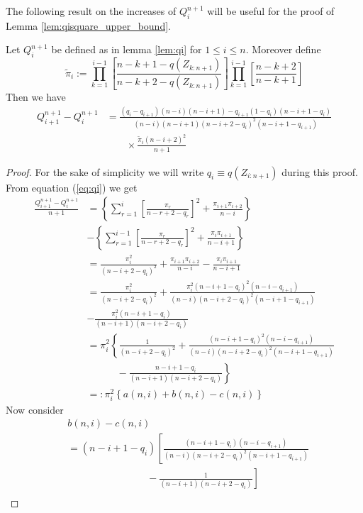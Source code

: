 %
The following result on the increases of $Q_i^{n+1}$ will be useful for the proof of Lemma \ref{lem:qisquare_upper_bound}.
\begin{lemma}
	Let $Q_i^{n+1}$ be defined as in lemma \ref{lem:qi} for $1\leq i\leq n$. Moreover define 
	$$\tilde{\pi}_i := \prod\limits_{k=1}^{i-1} \left[\frac{n-k+1-q(Z_{k:n+1})}{n-k+2-q(Z_{k:n+1})}\right]\prod\limits_{k=1}^{i-1} \left[\frac{n-k+2}{n-k+1}\right]$$
	Then we have
	\begin{align*}
		Q_{i+1}^{n+1} - Q_{i}^{n+1} &= \frac{(q_i-q_{i+1})(n-i)(n-i+1)-q_{i+1}(1-q_i)(n-i+1-q_i) }{(n-i)(n-i+1)(n-i+2-q_i)^2(n-i+1-q_{i+1})}\\
		&\qquad\times \frac{\tilde{\pi}_i(n-i+2)^2}{n+1}
	\end{align*}
	\label{lem:qi_increas}
%
	\begin{proof}
		For the sake of simplicity we will write $q_{i}\equiv q(Z_{i:n+1})$ during this proof. From equation (\ref{eq:qi}) we get
		\begin{align}
		\frac{Q_{i+1}^{n+1}-Q_i^{n+1}}{n+1} &= \left\{ \sum\limits_{r=1}^{i} \left[ \frac{\pi_r}{n-r+2-q_r} \right]^2 + \frac{\pi_{i+1}\pi_{i+2}}{n-i} \right\}\nonumber\\
		& - \left\{ \sum\limits_{r=1}^{i-1} \left[ \frac{\pi_r}{n-r+2-q_r} \right]^2 + \frac{\pi_i\pi_{i+1}}{n-i+1} \right\}\nonumber\\
		&= \frac{\pi_i^2}{(n-i+2-q_i)^2}+\frac{\pi_{i+1}\pi_{i+2}}{n-i}-\frac{\pi_{i}\pi_{i+1}}{n-i+1} \nonumber\\
		&= \frac{\pi_i^2}{(n-i+2-q_i)^2} + \frac{\pi_{i}^2(n-i+1-q_i)^2(n-i-q_{i+1})}{(n-i)(n-i+2-q_i)^2(n-i+1-q_{i+1})}\nonumber\\
		&  - \frac{\pi_{i}^2(n-i+1-q_i)}{(n-i+1)(n-i+2-q_i)} \nonumber\\
		&= \pi_i^2\left\{\frac{1}{(n-i+2-q_i)^2} + \frac{(n-i+1-q_i)^2(n-i-q_{i+1})}{(n-i)(n-i+2-q_i)^2(n-i+1-q_{i+1})}\right.\nonumber\\
		&  \left.\qquad\quad - \frac{n-i+1-q_i}{(n-i+1)(n-i+2-q_i)} \right\}\nonumber\\
		&=: \pi_i^2\left\{a(n,i) + b(n,i) - c(n,i) \right\}
		\label{eq:qi_diffaa}
		\end{align}
		Now consider 
		\begin{align}
		& b(n,i) - c(n,i) \nonumber\\
		&= (n-i+1-q_i)\left[\frac{(n-i+1-q_i)(n-i-q_{i+1})}{(n-i)(n-i+2-q_i)^2(n-i+1-q_{i+1})}\right.\nonumber \\
		& \left. \qquad\qquad\qquad\qquad - \frac{1}{(n-i+1)(n-i+2-q_i)}\right]\nonumber\\

\end{align}
\end{proof}
\end{lemma}
